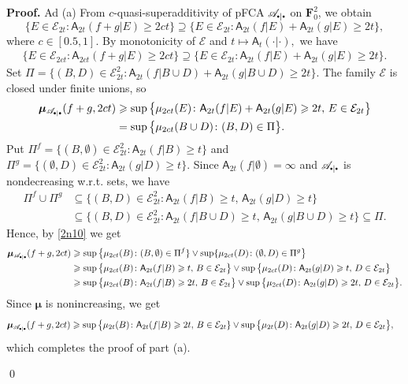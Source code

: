 \documentclass[preprint,11pt]{elsarticle}
\theoremstyle{definition}
\renewenvironment{proof}[1][\textbf{Proof}]{\noindent\textbf{#1.} }{\hfill\qed\vspace{2.5ex}}
\newcommand\bF{\mathbf{F}} %
\newcommand\bFs{\bF_0^2} %
\newcommand\cE{{\mathcal E}}
\newcommand\sA{\mathsf{A}}
\newcommand\aAd[3][E]{\sA_{#3}(#2|#1)}%
\newcommand\sbullet[1][.5]{\mathbin{\vcenter{\hbox{\scalebox{#1}{$\bullet$}}}}}
\newcommand\bpeA{\mathscr {A}_{\sbullet|\sbullet}}%
\newcommand\bE{{\mathscr {E}}}
\newcommand{\bmu}{\boldsymbol{\mu}}
\newcommand\bmub[1][\bpeA]{\bmu_{#1}}
\renewcommand\ge{\geqslant}
\begin{document}
\begin{proof}
Ad (a) From  $c$-quasi-superadditivity of pFCA $\bpeA$ on $\bFs$, we obtain
$$\{E\in\cE_{2t} \colon \aAd{f+g}{2t} \ge 2c t\}\supseteq \{E\in\cE_{2t} \colon \aAd{f}{2t}+\aAd{g}{2t} \ge 2t\},
$$
where $c\in [0{.}5, 1].$
By monotonicity of $\bE$ and $t\mapsto \sA_t(\cdot|\cdot),$ we have
\begin{align*}
    \{E\in\cE_{2ct} \colon \aAd{f+g}{2ct} \ge 2c t\}\supseteq \{E\in\cE_{2t} \colon \aAd{f}{2t}+\aAd{g}{2t} \ge 2t\}.
\end{align*}
Set $\Pi=\{(B,D)\in \cE_{2t}^2  \colon \aAd[B\cup D]{f}{2t}+\aAd[B\cup D]{g}{2t}\ge 2t\}.$
The family $\bE$ is closed under finite unions, so
\begin{align}\label{2n10}
    \bmub(f+g,2ct)&\ge \sup\big\{\mu_{2ct}(E)\colon \aAd{f}{2t}+\aAd{g}{2t}\ge 2t,\, E\in \cE_{2t}\big\}\notag
    \\&=\sup\big\{\mu_{2ct}(B\cup D)\colon (B,D)\in \Pi\big\}.
\end{align}
Put
$\Pi^f=\{(B,\emptyset)\in \cE_{2t}^2
\colon \aAd[B]{f}{2t}\ge t\}$ and  $\Pi^g=\{(\emptyset,D)\in \cE_{2t}^2
\colon \aAd[D]{g}{2t}\ge t\}.$
Since $\sA_{2t}(f|\emptyset)=\infty$ and $\bpeA$ is nondecreasing w.r.t. sets, we have
\begin{align*}
 \Pi^f\cup \Pi^g&\subseteq
\{(B,D)\in \cE_{2t}^2\colon \aAd[B]{f}{2t}\ge t,\, \aAd[D]{g}{2t}\ge t\}
\\&\subseteq
\{(B,D)\in \cE^2_{2t}\colon \aAd[B\cup D]{f}{2t}\ge t,\, \aAd[B\cup D]{g}{2t}\ge t\}\subseteq \Pi.
\end{align*}
Hence, by \eqref{2n10} we get
\begin{align*}
    \bmub(f+g,2ct)&\ge \sup\big\{\mu_{2ct}(B)
    \colon (B,\emptyset)\in \Pi^f\} \vee \sup\{\mu_{2ct}(D) \colon (\emptyset ,D)\in \Pi^g\big\}\notag
    \\&\ge \sup\big\{\mu_{2ct}(B)\colon \sA_{2t}(f|B)\ge t,\,B\in \cE_{2t}\big\} \vee \sup\big\{\mu_{2ct}(D)\colon \sA_{2t}(g|D)\ge t,\,D\in \cE_{2t}\big\}\notag
    \\&\ge \sup\big\{\mu_{2ct}(B)\colon \sA_{2t}(f|B)\ge 2t,\,B\in \cE_{2t}\big\} \vee \sup\big\{\mu_{2ct}(D)\colon \sA_{2t}(g|D)\ge 2t,\,D\in \cE_{2t}\big\}.
\end{align*}
Since $\bmu$ is nonincreasing,
we get
\begin{align*}
    \bmub(f+g,2ct)&\ge \sup\big\{ \mu_{2t}(B)\colon \aAd[B]{f}{2t}\ge 2t,\, B\in\cE_{2t}\}\vee \sup\big\{ \mu_{2t}(D)\colon   \aAd[D]{g}{2t}\ge 2t,\,D\in\cE_{2t}\big\},
\end{align*}
which completes the proof of part (a).


\end{proof}
\end{document}
